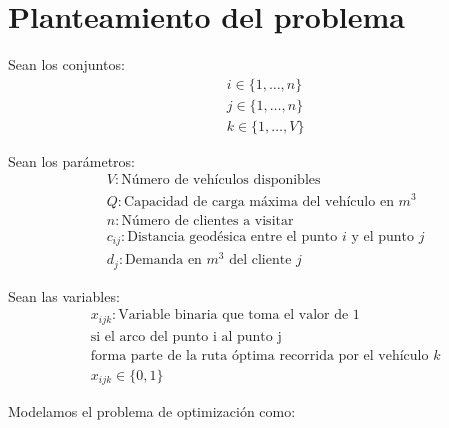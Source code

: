 \documentclass[journal]{IEEEtran}
\begin{document}
    \section{Planteamiento del problema} \label{sec:problem}

        Sean los conjuntos:
        \begin{align*}
            & i \in \{1, \dots, n \} \\
            & j \in \{1, \dots, n \} \\
            & k \in \{1, \dots, V \}
        \end{align*}
        
        Sean los parámetros:
        \begin{align*}
            & V: \text{Número de vehículos disponibles} \\
            & Q: \text{Capacidad de carga máxima del vehículo en } m^3 \\
            & n: \text{Número de clientes a visitar} \\
            & c_{ij}: \text{Distancia geodésica entre el punto } i \text{ y el punto } j \\
            & d_j: \text{Demanda en } m^3 \text{ del cliente } j 
        \end{align*}
        
        Sean las variables:
        \begin{align*}
            & x_{ijk}: \text{Variable binaria que toma el valor de 1}\\
            & \text{si el arco del punto i al punto j} \\
            & \text{forma parte de la ruta óptima recorrida por el vehículo } k \\
            & x_{ijk} \in \{0, 1\}
        \end{align*}
        
        Modelamos el problema de optimización como:
        
\end{document}
